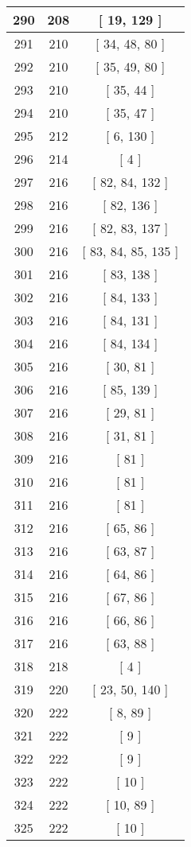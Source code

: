 \begin{center}
\begin{longtable}[H]{|| c c c ||}
\hline
290 & 208 & [ 19, 129 ] \\ 
\hline
291 & 210 & [ 34, 48, 80 ] \\ 
\hline
292 & 210 & [ 35, 49, 80 ] \\ 
\hline
293 & 210 & [ 35, 44 ] \\ 
\hline
294 & 210 & [ 35, 47 ] \\ 
\hline
295 & 212 & [ 6, 130 ] \\ 
\hline
296 & 214 & [ 4 ] \\ 
\hline
297 & 216 & [ 82, 84, 132 ] \\ 
\hline
298 & 216 & [ 82, 136 ] \\ 
\hline
299 & 216 & [ 82, 83, 137 ] \\ 
\hline
300 & 216 & [ 83, 84, 85, 135 ] \\ 
\hline
301 & 216 & [ 83, 138 ] \\ 
\hline
302 & 216 & [ 84, 133 ] \\ 
\hline
303 & 216 & [ 84, 131 ] \\ 
\hline
304 & 216 & [ 84, 134 ] \\ 
\hline
305 & 216 & [ 30, 81 ] \\ 
\hline
306 & 216 & [ 85, 139 ] \\ 
\hline
307 & 216 & [ 29, 81 ] \\ 
\hline
308 & 216 & [ 31, 81 ] \\ 
\hline
309 & 216 & [ 81 ] \\ 
\hline
310 & 216 & [ 81 ] \\ 
\hline
311 & 216 & [ 81 ] \\ 
\hline
312 & 216 & [ 65, 86 ] \\ 
\hline
313 & 216 & [ 63, 87 ] \\ 
\hline
314 & 216 & [ 64, 86 ] \\ 
\hline
315 & 216 & [ 67, 86 ] \\ 
\hline
316 & 216 & [ 66, 86 ] \\ 
\hline
317 & 216 & [ 63, 88 ] \\ 
\hline
318 & 218 & [ 4 ] \\ 
\hline
319 & 220 & [ 23, 50, 140 ] \\ 
\hline
320 & 222 & [ 8, 89 ] \\ 
\hline
321 & 222 & [ 9 ] \\ 
\hline
322 & 222 & [ 9 ] \\ 
\hline
323 & 222 & [ 10 ] \\ 
\hline
324 & 222 & [ 10, 89 ] \\ 
\hline
325 & 222 & [ 10 ] \\ 

\end{longtable}
\end{center}

